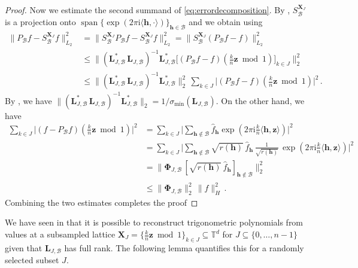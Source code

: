 \documentclass[a4paper]{amsart}
\renewcommand{\hat}{\widehat}
\DeclareMathOperator{\Span}{span}
\newcommand{\modone}{\bmod{}1}
\begin{document}
\begin{proof}
    Now we estimate the second summand of \eqref{eq:errordecomposition}.
    By , $S_{\mathcal B}^{\bm X_J}$ is a projection onto $\Span\{\exp(2\pi\mathrm i\langle\bm h,\cdot\rangle)\}_{\bm h\in\mathcal B}$ and we obtain using 
    \begin{align*}
        \|P_{\mathcal B} f - S_{\mathcal B}^{\bm X_J} f\|_{L_2}^2
        &= \|S_{\mathcal B}^{\bm X_J} P_{\mathcal B} f - S_{\mathcal B}^{\bm X_J} f\|_{L_2}^2
        = \|S_{\mathcal B}^{\bm X_J} (P_{\mathcal B} f - f)\|_{L_2}^2 \\
        &\le \Big\|(\bm L_{J,\mathcal B}^\ast \, \bm L_{J,\mathcal B})^{-1} \bm L_{J,\mathcal B}^{\ast} \Big[(P_{\mathcal B} f-f) (\tfrac kn\bm z \modone)\Big]_{k\in J} \Big\|_{2}^2 \\
        &\le \|(\bm L_{J,\mathcal B}^\ast \, \bm L_{J,\mathcal B})^{-1} \bm L_{J,\mathcal B}^{\ast} \|_{2}^2 \, \sum_{k\in J} \Big|(P_{\mathcal B} f-f) (\tfrac kn\bm z \modone) \Big|^2 \,.
    \end{align*}
    By \cite[Proposition~3.1]{KUV19}, we have $\| (\bm L_{J,\mathcal B}^\ast \, \bm L_{J,\mathcal B})^{-1}\bm L_{J,\mathcal B}^\ast \|_{2} = 1/\sigma_{\min} (\bm L_{J,\mathcal B})$.
    On the other hand, we have
    \begin{align*}
        \sum_{k\in J} \Big|(f-P_{\mathcal B} f) (\tfrac kn \bm z \modone) \Big|^2
        &= \sum_{k\in J} \Big| \sum_{\bm h\notin\mathcal B} \hat f_{\bm h} \exp(2\pi\mathrm i \tfrac{k}{n}\langle\bm h, \bm z\rangle) \Big|^2 \\
        &= \sum_{k\in J} \Big| \sum_{\bm h\notin\mathcal B} \sqrt{r(\bm h)} \, \hat f_{\bm h} \, \frac{1}{\sqrt{r(\bm h)}} \, \exp(2\pi\mathrm i \tfrac{k}{n}\langle\bm h, \bm z\rangle) \Big|^2 \\
        &= \|\bm\Phi_{J,\mathcal B} \, [\sqrt{r(\bm h)} \, \hat f_{\bm h}]_{\bm h\notin\mathcal B} \|_{2}^{2} \\
        &\le \|\bm\Phi_{J,\mathcal B}\|_{2}^{2} \, \|f\|_H^2 \,.
    \end{align*}
    Combining the two estimates completes the proof
\end{proof} 

We have seen in  that it is possible to reconstruct trigonometric polynomials from values at a subsampled lattice $\bm X_J = \{\frac kn \bm z\modone\}_{k\in J} \subseteq\mathds T^d$ for $J\subseteq\{0, \dots, n-1\}$ given that $\bm L_{J,\mathcal B}$ has full rank.
The following lemma quantifies this for a randomly selected subset $J$.
\end{document}
